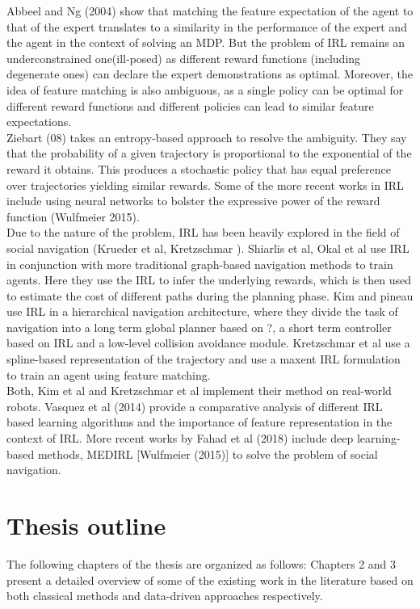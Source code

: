 Abbeel and Ng (2004) show that matching the feature expectation of the agent to that of the expert translates to a similarity in the performance of the expert and the agent in the context of solving an MDP. But the problem of IRL remains an underconstrained one(ill-posed) as different reward functions (including degenerate ones) can declare the expert demonstrations as optimal. Moreover, the idea of feature matching is also ambiguous, as a single policy can be optimal for different reward functions and different policies can lead to similar feature expectations. \\

Ziebart (08) takes an entropy-based approach to resolve the ambiguity. They say that the probability of a given trajectory is proportional to the exponential of the reward it obtains. This produces a stochastic policy that has equal preference over trajectories yielding similar rewards. Some of the more recent works in IRL include using neural networks to bolster the expressive power of the reward function (Wulfmeier 2015). \\

Due to the nature of the problem, IRL has been heavily explored in the field of social navigation (Krueder et al, Kretzschmar ). Shiarlis et al, Okal et al use IRL in conjunction with more traditional graph-based navigation methods to train agents. Here they use the IRL to infer the underlying rewards, which is then used to estimate the cost of different paths during the planning phase. Kim and pineau use IRL in a hierarchical navigation architecture, where they divide the task of navigation into a long term global planner based on ?, a short term controller based on IRL and a low-level collision avoidance module. Kretzschmar et al use a spline-based representation of the trajectory and use a maxent IRL formulation to train an agent using feature matching. 
\\
Both, Kim et al and Kretzschmar et al implement their method on real-world robots. Vasquez et al (2014) provide a comparative analysis of different IRL based learning algorithms and the importance of feature representation in the context of IRL. More recent works by Fahad et al (2018) include deep learning-based methods, MEDIRL [Wulfmeier (2015)] to solve the problem of social navigation.
\section{Thesis outline}


The following chapters of the thesis are organized as follows:
Chapters 2 and 3 present a detailed overview of some of the existing work in the literature based on both classical methods and data-driven approaches respectively.

